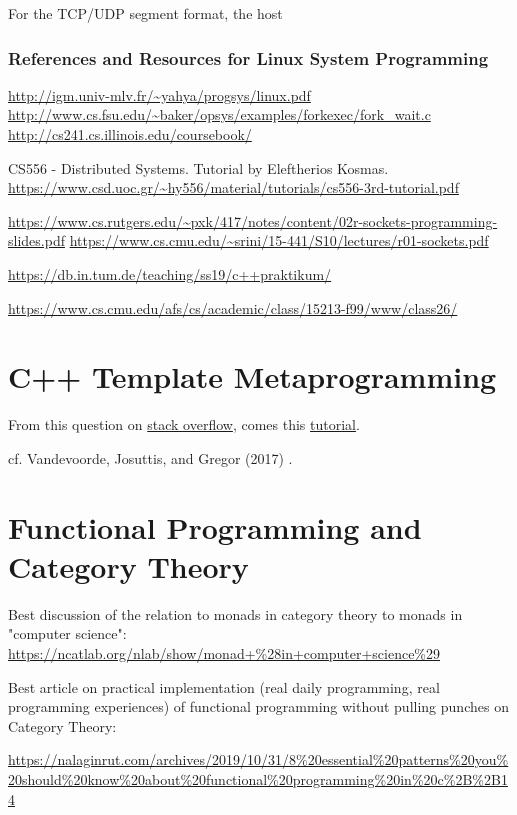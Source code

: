 \documentclass[10pt]{amsart}
\begin{document}
\begin{multicols*}{2}
For the TCP/UDP segment format, the host


\section{References and Resources for Linux System Programming}

\url{http://igm.univ-mlv.fr/~yahya/progsys/linux.pdf} \\
\url{http://www.cs.fsu.edu/~baker/opsys/examples/forkexec/fork_wait.c} \\
\url{http://cs241.cs.illinois.edu/coursebook/}

CS556 - Distributed Systems. Tutorial by Eleftherios Kosmas.
\url{https://www.csd.uoc.gr/~hy556/material/tutorials/cs556-3rd-tutorial.pdf}


\url{https://www.cs.rutgers.edu/~pxk/417/notes/content/02r-sockets-programming-slides.pdf}
\url{https://www.cs.cmu.edu/~srini/15-441/S10/lectures/r01-sockets.pdf}

\url{https://db.in.tum.de/teaching/ss19/c++praktikum/}

\url{https://www.cs.cmu.edu/afs/cs/academic/class/15213-f99/www/class26/}


\part{C++ Template Metaprogramming}

From this question on \href{https://stackoverflow.com/questions/112277/best-introduction-to-c-template-metaprogramming}{stack overflow}, comes this \href{http://www.cs.rpi.edu/~musser/design/blitz/meta-art.html}{tutorial}. 

cf. Vandevoorde, Josuttis, and Gregor (2017) \cite{VJG2017}. 

\part{Functional Programming and Category Theory}

Best discussion of the relation to monads in category theory to monads in "computer science": \url{https://ncatlab.org/nlab/show/monad+%28in+computer+science%29}

Best article on practical implementation (real daily programming, real programming experiences) of functional programming without pulling punches on Category Theory:

\url{https://nalaginrut.com/archives/2019/10/31/8%20essential%20patterns%20you%20should%20know%20about%20functional%20programming%20in%20c%2B%2B14}


\end{multicols*}
\end{document}
